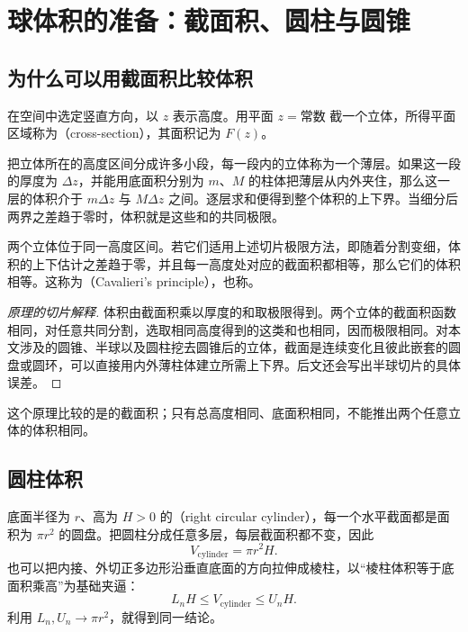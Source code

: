 \documentclass[UTF8]{ctexart}
\begin{document}
\section{球体积的准备：截面积、圆柱与圆锥}
\label{sec:cs-solid-preparation}

\subsection{为什么可以用截面积比较体积}

在空间中选定竖直方向，以 $z$ 表示高度。用平面 $z=\text{常数}$ 截一个立体，所得平面区域称为（cross-section），其面积记为 $F(z)$。

把立体所在的高度区间分成许多小段，每一段内的立体称为一个薄层。如果这一段的厚度为 $\Delta z$，并能用底面积分别为 $m$、$M$ 的柱体把薄层从内外夹住，那么这一层的体积介于 $m\Delta z$ 与 $M\Delta z$ 之间。逐层求和便得到整个体积的上下界。当细分后两界之差趋于零时，体积就是这些和的共同极限。

\begin{theorem}[等高截面积比较]
两个立体位于同一高度区间。若它们适用上述切片极限方法，即随着分割变细，体积的上下估计之差趋于零，并且每一高度处对应的截面积都相等，那么它们的体积相等。这称为（Cavalieri's principle），也称。
\end{theorem}

\begin{proof}[原理的切片解释]
体积由截面积乘以厚度的和取极限得到。两个立体的截面积函数相同，对任意共同分割，选取相同高度得到的这类和也相同，因而极限相同。对本文涉及的圆锥、半球以及圆柱挖去圆锥后的立体，截面是连续变化且彼此嵌套的圆盘或圆环，可以直接用内外薄柱体建立所需上下界。后文还会写出半球切片的具体误差。
\end{proof}

这个原理比较的是的截面积；只有总高度相同、底面积相同，不能推出两个任意立体的体积相同。

\subsection{圆柱体积}

底面半径为 $r$、高为 $H>0$ 的（right circular cylinder），每一个水平截面都是面积为 $\pi r^2$ 的圆盘。把圆柱分成任意多层，每层截面积都不变，因此
\begin{equation}\label{eq:cs-cylinder-volume}
  V_{\mathrm{cylinder}}=\pi r^2H.
\end{equation}
也可以把内接、外切正多边形沿垂直底面的方向拉伸成棱柱，以“棱柱体积等于底面积乘高”为基础夹逼：
\[
  L_nH\leq V_{\mathrm{cylinder}}\leq U_nH.
\]
利用 $L_n,U_n\to\pi r^2$，就得到同一结论。
\end{document}

